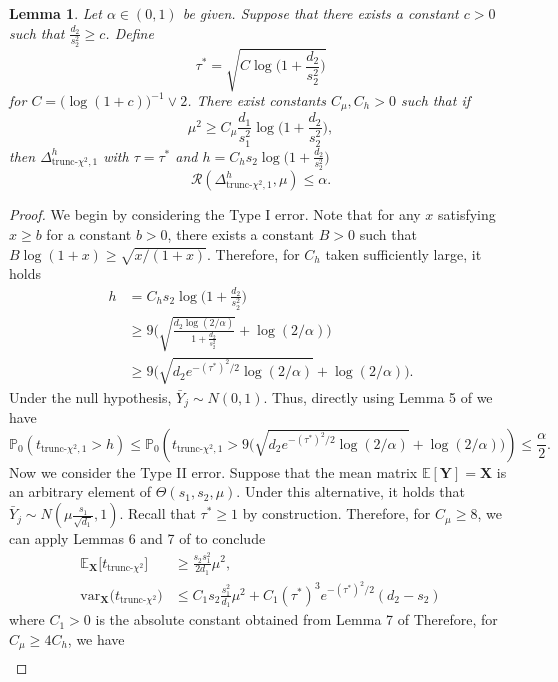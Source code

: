 \documentclass{article}
\newcommand{\X}{\mathbf{X}}
\newcommand{\Y}{\mathbf{Y}}
\newcommand{\bbP}{\mathbb{P}}
\newcommand{\cR}{\mathcal{R}}
\newcommand{\EE}{\mathbb{E}}
\newcommand{\var}{\textrm{var}}
\newcommand{\chisqlin}{\text{trunc-$\chi^2$}}
\newtheorem{lemma}{Lemma}
\theoremstyle{remark}
\begin{document}
\begin{lemma}\label{lem:linear-trunc-test}
    Let $\alpha \in (0,1)$ be given. Suppose that there exists a constant $c > 0$ such that $\frac{d_2}{s_2^2} \geq c$. Define 
    \[\tau^* = \sqrt{C\log\Big(1 + \frac{d_2}{s_2^2}\Big)}\]
    for $C = \big(\log(1 + c)\big)^{-1} \lor 2$. There exist constants $C_\mu, C_h > 0$ such that if 
    \[\mu^2 \geq C_\mu \frac{d_1}{s_1^2}\log\Big(1 + \frac{d_2}{s_2^2}\Big),\]
    then $\Delta_{\chisqlin, 1}^h$ with $\tau = \tau^*$ and $h = C_h s_2 \log\big(1 + \frac{d_2}{s_2^2}\big)$
    \[\cR(\Delta_{\chisqlin, 1}^h, \mu) \leq \alpha.\]
\end{lemma}
\begin{proof}
    We begin by considering the Type I error. Note that for any $x$ satisfying $x \geq b$ for a constant $b > 0$, there exists a constant $B > 0$ such that $B \log(1 + x) \geq \sqrt{x / (1 + x)}$. Therefore, for $C_h$ taken sufficiently large, it holds
    \begin{align*}
        h &= C_h s_2 \log\big(1 + \frac{d_2}{s_2^2}\big) \\
        &\geq 9\Big(\sqrt{\frac{d_2\log(2/\alpha)}{1 + \frac{d_2}{s_2^2}}} + \log(2/\alpha)\Big) \\
        &\geq 9\Bigg(\sqrt{d_2e^{-(\tau^*)^2/2}\log(2/\alpha)} + \log(2/\alpha)\Bigg).
    \end{align*}
    Under the null hypothesis, $\bar{Y}_j \sim N(0,1)$. Thus, directly using Lemma 5 of \cite{liu2021minimax} we have 
    \[\bbP_0(t_{\chisqlin, 1} > h) \leq \bbP_0\left(t_{\chisqlin, 1} > 9\Big(\sqrt{d_2e^{-(\tau^*)^2/2}\log(2/\alpha)} + \log(2/\alpha)\Big)\right) \leq  \frac{\alpha}{2}.\]
    Now we consider the Type II error. Suppose that the mean matrix $ \EE[\Y] = \X$ is an arbitrary element of $\Theta(s_1, s_2, \mu)$. Under this alternative, it holds that $\bar{Y}_j \sim N(\mu \frac{s_1}{\sqrt{d_1}}, 1)$. Recall that $\tau^* \geq 1$ by construction. Therefore, for $C_\mu \geq 8$, we can apply Lemmas 6 and 7 of \cite{liu2021minimax} to conclude
    \begin{align*}
        \EE_\X\big[t_{\chisqlin}\big] &\geq \frac{s_2s_1^2}{2d_1}\mu^2, \\
        \var_\X\big(t_{\chisqlin}\big) &\leq C_1s_2\frac{s_1^2}{d_1}\mu^2 + C_1 (\tau^*)^3e^{-(\tau^*)^2/2}(d_2 - s_2)
    \end{align*}
    where $C_1 > 0$ is the absolute constant obtained from Lemma 7 of \cite{liu2021minimax} Therefore, for $C_\mu \geq 4C_h$, we have 
    \begin{align*}

\end{align*}
\end{proof}
\end{document}
